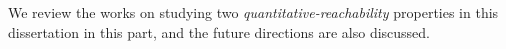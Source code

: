 We review the works on studying two \emph{quantitative-reachability} properties in this dissertation in this part, 
and the future directions are also discussed. 